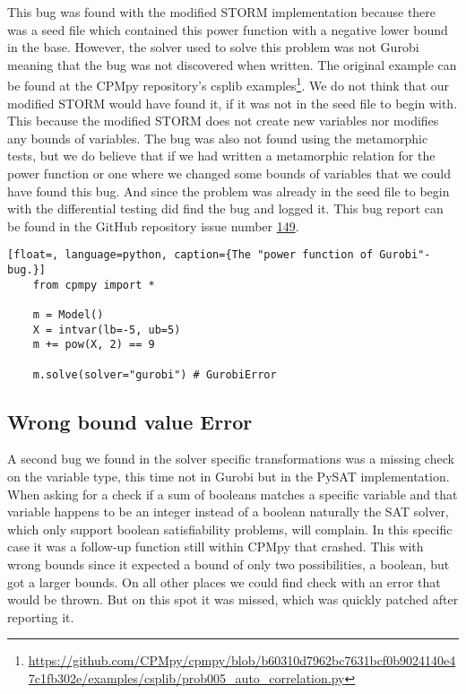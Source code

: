 This bug was found with the modified STORM implementation because there was a seed file which contained this power function with a negative lower bound in the base. However, the solver used to solve this problem was not Gurobi meaning that the bug was not discovered when written. The original example can be found at the CPMpy repository's csplib examples\footnote{\url{https://github.com/CPMpy/cpmpy/blob/b60310d7962bc7631bcf0b9024140e47c1fb302e/examples/csplib/prob005_auto_correlation.py}}. We do not think that our modified STORM would have found it, if it was not in the seed file to begin with. This because the modified STORM does not create new variables nor modifies any bounds of variables. The bug was also not found using the metamorphic tests, but we do believe that if we had written a metamorphic relation for the power function or one where we changed some bounds of variables that we could have found this bug. And since the problem was already in the seed file to begin with the differential testing did find the bug and logged it. This bug report can be found in the GitHub repository issue number \href{https://github.com/CPMpy/cpmpy/issues/149}{149}.

\label{lst:Bug:PowGurobi}
\begin{lstlisting}[float=, language=python, caption={The "power function of Gurobi"-bug.}]
	from cpmpy import *

	m = Model()
	X = intvar(lb=-5, ub=5)
	m += pow(X, 2) == 9

	m.solve(solver="gurobi") # GurobiError
\end{lstlisting}



\subsection{Wrong bound value Error}
\label{res:bug:WrongBounds}
A second bug we found in the solver specific transformations was a missing check on the variable type, this time not in Gurobi but in the PySAT implementation. When asking for a check if a sum of booleans matches a specific variable and that variable happens to be an integer instead of a boolean naturally the SAT solver, which only support boolean satisfiability problems, will complain. In this specific case it was a follow-up function still within CPMpy that crashed. This with wrong bounds since it expected a bound of only two possibilities, a boolean, but got a larger bounds. On all other places we could find check with an error that would be thrown. But on this spot it was missed, which was quickly patched after reporting it.


